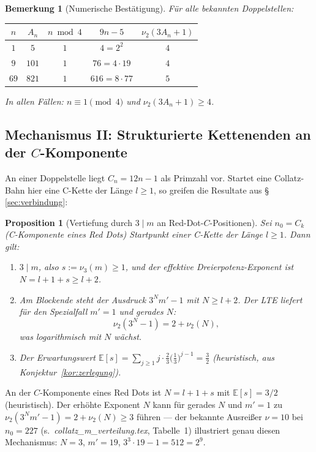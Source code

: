 \documentclass[12pt,a4paper]{article}
\newtheorem{proposition}[definition]{Proposition}
\newtheorem{bemerkung}[definition]{Bemerkung}
\newcommand{\vii}{\nu_2}
\newcommand{\viii}{\nu_3}
\newcommand{\E}{\mathbb{E}}
\begin{document}
\begin{bemerkung}[Numerische Bestätigung]
Für alle bekannten Doppelstellen:
\begin{center}
\renewcommand{\arraystretch}{1.3}
\begin{tabular}{ccccc}
\toprule
$n$ & $A_n$ & $n \bmod 4$ & $9n-5$ & $\vii(3A_n+1)$ \\
\midrule
$1$  & $5$   & $1$ & $4 = 2^2$       & $4$ \\
$9$  & $101$ & $1$ & $76 = 4 \cdot 19$ & $4$ \\
$69$ & $821$ & $1$ & $616 = 8 \cdot 77$ & $5$ \\
\bottomrule
\end{tabular}
\end{center}
In allen Fällen: $n \equiv 1 \pmod 4$ und $\vii(3A_n+1) \geq 4$.
\end{bemerkung}

\subsection{Mechanismus II: Strukturierte Kettenenden an der \texorpdfstring{$C$}{C}-Komponente}

An einer Doppelstelle liegt $C_n = 12n-1$ als Primzahl vor. Startet eine
Collatz-Bahn hier eine C-Kette der Länge $l \geq 1$, so greifen die
Resultate aus §\,\ref{sec:verbindung}:

\begin{proposition}[Vertiefung durch $3 \mid m$ an Red-Dot-$C$-Positionen]
\label{prop:c_tiefe}
Sei $n_0 = C_k$ (C-Komponente eines Red Dots) Startpunkt einer C-Kette
der Länge $l \geq 1$. Dann gilt:
\begin{enumerate}[label=\upshape(\roman*)]
  \item $3 \mid m$, also $s := \viii(m) \geq 1$, und der effektive
    Dreierpotenz-Exponent ist $N = l+1+s \geq l+2$.
  \item Am Blockende steht der Ausdruck $3^N m' - 1$ mit $N \geq l+2$.
    Der LTE liefert für den Spezialfall $m' = 1$ und gerades $N$:
    \[
      \vii(3^N - 1) = 2 + \vii(N),
    \]
    was logarithmisch mit $N$ wächst.
  \item Der Erwartungswert $\E[s] = \sum_{j \geq 1} j \cdot \frac{2}{3}
    \bigl(\frac{1}{3}\bigr)^{j-1} = \frac{3}{2}$
    (heuristisch, aus Konjektur~\ref{kor:zerlegung}).
\end{enumerate}
\end{proposition}

\begin{tcolorbox}[reddot, title={Red-Dot-Kontraktionsbonus (Mechanismus II)}]
An der $C$-Komponente eines Red Dots ist $N = l + 1 + s$ mit
$\E[s] = 3/2$ (heuristisch).
Der erhöhte Exponent $N$ kann für gerades $N$ und $m' = 1$ zu
$\vii(3^N m' - 1) = 2 + \vii(N) \geq 3$ führen --- der bekannte
Ausreißer $\nu = 10$ bei $n_0 = 227$ (s.\ \textit{collatz\_m\_verteilung.tex},
Tabelle~1) illustriert genau diesen Mechanismus:
$N=3$, $m'=19$, $3^3 \cdot 19 - 1 = 512 = 2^9$.
\end{tcolorbox}
\end{document}
